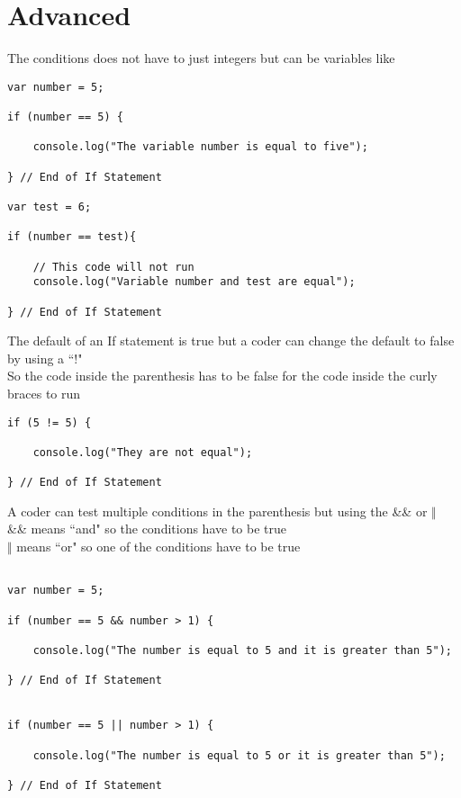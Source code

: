 \documentclass[12pt, letterpaper]{article}
\begin{document}
\section*{Advanced}

The conditions does not have to just integers but can be variables like \\

\begin{lstlisting}
var number = 5;

if (number == 5) {

	console.log("The variable number is equal to five");

} // End of If Statement

var test = 6;

if (number == test){

	// This code will not run
	console.log("Variable number and test are equal");

} // End of If Statement
\end{lstlisting}
The default of an If statement is true but a coder can change the default to false by using a ``!" \\
So the code inside the parenthesis has to be false for the code inside the curly braces to run \\

\begin{lstlisting}
if (5 != 5) {

	console.log("They are not equal");

} // End of If Statement
\end{lstlisting}
A coder can test multiple conditions in the parenthesis but using the \&\& or  $\Vert$ \\
\&\& means ``and" so the conditions have to be true \\
$\Vert$ means ``or" so one of the conditions have to be true

\begin{lstlisting}

var number = 5;

if (number == 5 && number > 1) {

	console.log("The number is equal to 5 and it is greater than 5");

} // End of If Statement


if (number == 5 || number > 1) {

	console.log("The number is equal to 5 or it is greater than 5");

} // End of If Statement

\end{lstlisting}
\end{document}
